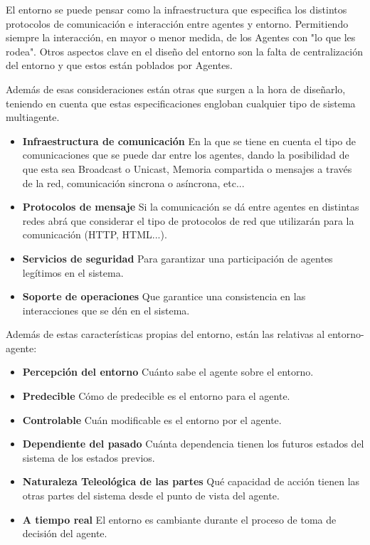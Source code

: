 El entorno se puede pensar como la infraestructura que especifica los distintos protocolos de comunicación e interacción entre agentes y entorno. Permitiendo siempre la interacción, en mayor o menor medida, de los Agentes con "lo que les rodea". Otros aspectos clave en el diseño del entorno son la falta de centralización del entorno y que estos están poblados por Agentes. 

Además de esas consideraciones están otras que surgen a la hora de diseñarlo, teniendo en cuenta que estas especificaciones engloban cualquier tipo de sistema multiagente.

\begin{itemize}
	\item\textbf{Infraestructura de comunicación} En la que se tiene en cuenta el tipo de comunicaciones que se puede dar entre los agentes, dando la posibilidad de que esta sea Broadcast o Unicast, Memoria compartida o mensajes a través de la red, comunicación sincrona o asíncrona, etc...
	\item\textbf{Protocolos de mensaje} Si la comunicación se dá entre agentes en distintas redes abrá que considerar el tipo de protocolos de red que utilizarán para la comunicación (HTTP, HTML...).
	\item\textbf{Servicios de seguridad} Para garantizar una participación de agentes legítimos en el sistema.
	\item\textbf{Soporte de operaciones} Que garantice una consistencia en las interacciones que se dén en el sistema.
\end{itemize}

Además de estas características propias del entorno, están las relativas al entorno-agente:

\begin{itemize}
	\item\textbf{Percepción del entorno} Cuánto sabe el agente sobre el entorno.
	\item\textbf{Predecible} Cómo de predecible es el entorno para el agente.
	\item\textbf{Controlable} Cuán modificable es el entorno por el agente.
	\item\textbf{Dependiente del pasado} Cuánta dependencia tienen los futuros estados del sistema de los estados previos.
	\item\textbf{Naturaleza Teleológica de las partes} Qué capacidad de acción tienen las otras partes del sistema desde el punto de vista del agente.
	\item\textbf{A tiempo real} El entorno es cambiante durante el proceso de toma de decisión del agente.
\end{itemize}

